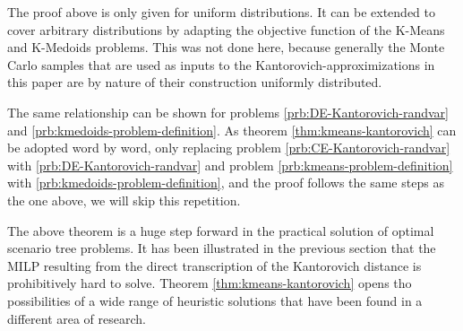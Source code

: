 \begin{Note}
  The proof above is only given for uniform distributions.
  It can be extended to cover arbitrary distributions by adapting the objective function of the K-Means and K-Medoids problems.
  This was not done here, because generally the Monte Carlo samples that are used as inputs to the Kantorovich-approximizations in this paper are by nature of their construction uniformly distributed.
\end{Note}
The same relationship can be shown for problems \ref{prb:DE-Kantorovich-randvar} and \ref{prb:kmedoids-problem-definition}.
As theorem \ref{thm:kmeans-kantorovich} can be adopted word by word, only replacing problem \ref{prb:CE-Kantorovich-randvar} with \ref{prb:DE-Kantorovich-randvar} and problem \ref{prb:kmeans-problem-definition} with \ref{prb:kmedoids-problem-definition}, and the proof follows the same steps as the one above, we will skip this repetition.

The above theorem is a huge step forward in the practical solution of optimal scenario tree problems.
It has been illustrated in the previous section that the MILP resulting from the direct transcription of the Kantorovich distance is prohibitively hard to solve.
Theorem \ref{thm:kmeans-kantorovich} opens tho possibilities of a wide range of heuristic solutions that have been found in a different area of research.

